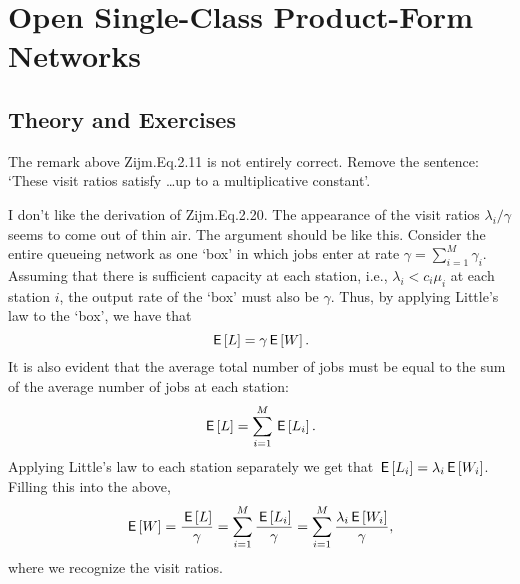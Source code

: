 \section{Open Single-Class Product-Form Networks}
\label{sec:jackson-networks}


\subsection*{Theory and Exercises}


The remark above Zijm.Eq.2.11 is not entirely correct. Remove the
sentence: `These visit ratios satisfy \ldots up to a multiplicative
constant'.


I don't like the derivation of Zijm.Eq.2.20. The appearance of the
visit ratios $\lambda_i/\gamma$ seems to come out of thin air. The
argument should be like this. Consider the entire queueing network as
one `box' in which jobs enter at rate $\gamma=\sum_{i=1}^M
\gamma_i$.
Assuming that there is sufficient capacity at each station, i.e.,
$\lambda_i < c_i \mu_i$ at each station $i$, the output rate of the `box' must also be $\gamma$. Thus, by applying Little's law to the `box', we have that 
\begin{equation*}
 \,\mathsf{E}\left[L\right] = \gamma \,\mathsf{E}\left[W\right]. 
\end{equation*}
It is also evident that the average total number of jobs must be equal
to the sum of the average number of jobs at each station: 
\begin{equation*}
 \,\mathsf{E}\left[L\right] = \sum_{i=1}^M \,\mathsf{E}\left[L_i\right].
\end{equation*}
Applying Little's law to each station separately we get that
$\,\mathsf{E}\left[L_i\right] = \lambda_i\,\mathsf{E}\left[W_i\right]$. Filling this into the above,
\begin{equation*}
\,\mathsf{E}\left[W\right] = \frac{\,\mathsf{E}\left[L\right]}{\gamma} = \sum_{i=1}^M \frac{\,\mathsf{E}\left[L_i\right]}\gamma = \sum_{i=1}^M \frac{\lambda_i \,\mathsf{E}\left[ W_i\right]}\gamma, 
\end{equation*}
where we recognize the visit ratios.


